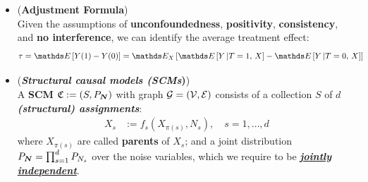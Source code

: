 \documentclass[11pt]{article}
\begin{document}
\begin{itemize}
\begin{itemize}
\item \begin{assumption}(\textbf{No Interference}) \citep{neal2020introduction}\\
\begin{align}
Y_{i}(t_1, \ldots, t_i, \ldots, t_n) &= Y_{i}(t_i) \label{eqn: no_interference}
\end{align}
\end{assumption}

\item \begin{assumption}(\textbf{Consistency}) \citep{neal2020introduction}\\
If the treatment is $T$, then the observed outcome $Y$ is the potential outcome under treatment $T$. Formally,
\begin{align}
T=t &\Rightarrow Y = Y(t) \label{eqn: consistency}
\end{align}
We could write this equivalently as follow:
\begin{align}
Y = Y(T) \label{eqn: consistency2}
\end{align}
\end{assumption}

\item \textbf{\emph{Stable unit-treatment value assumption (SUTVA)}} is satisfied if unit (individual) $i$'s outcome is simply a \textbf{function} of unit $i$'s treatment. Therefore, SUTVA is a combination of consistency and no interference (and also \emph{\textbf{deterministic}} potential outcomes). 
\end{itemize}

\item \begin{theorem}(\textbf{Adjustment Formula})  \citep{neal2020introduction}\\
Given the assumptions of \textbf{unconfoundedness}, \textbf{positivity}, \textbf{consistency}, and \textbf{no interference}, we can identify the average treatment effect:
\begin{align*}
\tau= \E{}{Y(1) - Y(0)} &= \E{X}{ \E{}{Y \,|T=1,\,X }- \E{}{Y \,|T=0, \, X}}  
\end{align*}
\end{theorem}

\item  \begin{definition} (\textbf{\emph{Structural causal models (SCMs})}) \citep{peters2017elements}\\
A \textbf{SCM} $\mathfrak{C}:= (S, P_{\boldsymbol{N}})$ with graph ${\mathcal G}=({\mathcal V}, {\mathcal E})$ consists of a collection $S$ of $d$ \emph{\textbf{(structural) assignments}}:
\begin{align}
X_{s} &:= f_{s}(X_{\pi(s)}, N_s), \quad s=1,\ldots, d \label{eqn: scm}
\end{align} where $X_{\pi(s)}$ are called \textbf{parents} of $X_s$; and a joint distribution $P_{\boldsymbol{N}} = \prod_{s=1}^{d}P_{N_{s}}$ over the noise variables, which we require to be \underline{\emph{\textbf{jointly independent}}}.


\end{definition}
\end{itemize}
\end{document}
